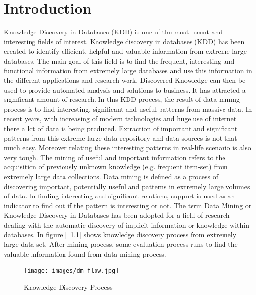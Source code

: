 %
\chapter{Introduction}
Knowledge Discovery in Databases (KDD) is one of the most recent and interesting fields of interest. Knowledge discovery in databases (KDD) has been created to identify efficient, helpful and valuable information from extreme large databases. The main goal of this field is to find the frequent, interesting and functional information from extremely large databases and use this information in the different applications and research work. Discovered Knowledge can then be used to provide automated analysis and solutions to business. It has attracted a significant amount of research. In this KDD process, the result of data mining process is to find interesting, significant and useful patterns from massive data. In recent years, with increasing of modern technologies and huge use of internet there a lot of data is being produced. Extraction of important and significant patterns from this extreme large data repository and data sources is not that much easy. Moreover relating these interesting patterns in real-life scenario is also very tough. The mining of useful and important information refers to the acquisition of previously unknown knowledge (e.g. frequent item-set) from extremely large data collections. Data mining is defined as a process of discovering important, potentially useful and patterns in extremely large volumes of data. In finding interesting and significant relations, support is used as an indicator to find out if the pattern is interesting or not. The term Data Mining or Knowledge Discovery in Databases has been adopted for a field of research dealing with the automatic discovery of implicit information or knowledge within databases. In figure [~\ref{figure:dm_flow}] shows knowledge discovery process from extremely large data set. After mining process, some evaluation process runs to find the valuable information found from data mining process.\\
\begin{figure}
\centering
  \texttt{[image: images/dm\_flow.jpg]}
\caption{Knowledge Discovery Process}
\label{figure:dm_flow}
\end{figure}
